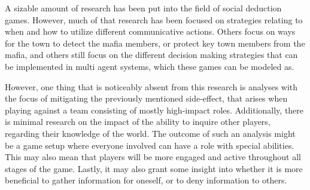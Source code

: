 A sizable amount of research has been put into the field of social deduction
games. However, much of that research has been focused on strategies relating
to when and how to utilize different communicative actions\cite{commitment}.
Others focus on ways for the town to detect the mafia
members\cite{werewolf_stealth}, or protect key town members from the
mafia\cite{werewolf_nash_equilibrium}, and others still focus on the different
decision making strategies that can be implemented in multi agent systems,
which these games can be modeled
as\cite{modelling_multi_agent_epistemic_systems}\cite{multi_agent_epistemic_planner_common_knowledge}\cite{probibalistic_multiagent_systems}.

However, one thing that is noticeably absent from this research is analyses
with the focus of mitigating the previously mentioned side-effect, that arises 
when playing against a team consisting of mostly high-impact roles. 
Additionally, there is minimal research on the impact of the ability to inquire 
other players, regarding their knowledge of the world. The outcome of such an 
analysis might be a game setup where everyone involved can have a role with 
special abilities. This may also mean that players will be more engaged and 
active throughout all stages of the game. Lastly, it may also grant some 
insight into whether it is more beneficial to gather information for oneself, 
or to deny information to others. 